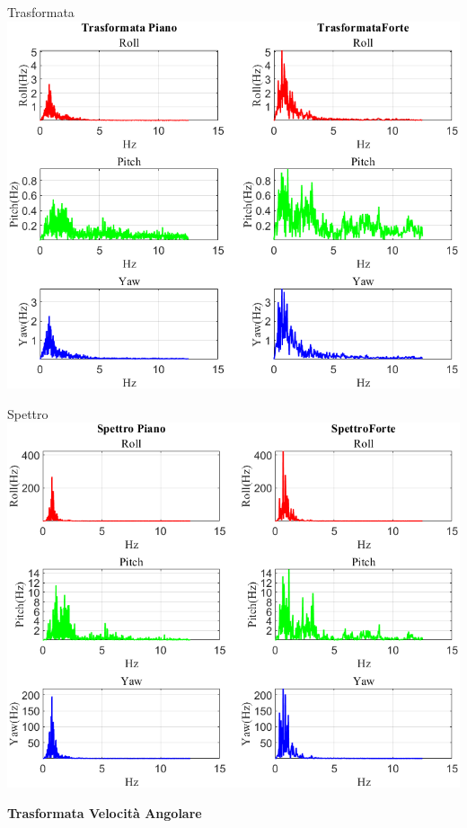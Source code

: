 \documentclass[beamer]{standalone}
\begin{document}
	\begin{frame}{{Trasformata}}
		\centering\includegraphics[height=.8\textheight]{figure/VAng/Trasformata/Trasformata}
	\end{frame}
	
	\begin{frame}{{Spettro}}
		\centering\includegraphics[height=.8\textheight]{figure/VAng/Trasformata/Spettro}
	\end{frame}
	
	\begin{frame}
		\color{blue}\centering\huge{\textbf{Trasformata Velocità Angolare}}
	\end{frame}
	
\end{document}
